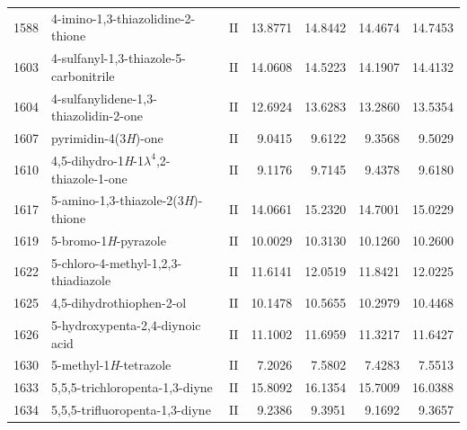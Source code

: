 \begin{longtable}{rlcd{2.5}d{2.5}d{2.5}d{2.5}}
    1588 & 4-imino-1,3-thiazolidine-2-thione                      & II & 13.8771 & 14.8442 & 14.4674 & 14.7453 \\
    1603 & 4-sulfanyl-1,3-thiazole-5-carbonitrile                 & II & 14.0608 & 14.5223 & 14.1907 & 14.4132 \\
    1604 & 4-sulfanylidene-1,3-thiazolidin-2-one                  & II & 12.6924 & 13.6283 & 13.2860 & 13.5354 \\
    1607 & pyrimidin-4(3\textit{H})-one                           & II & 9.0415  & 9.6122  & 9.3568  & 9.5029  \\
    1610 & 4,5-dihydro-1\textit{H}-1$\lambda^4$,2-thiazole-1-one  & II & 9.1176  & 9.7145  & 9.4378  & 9.6180  \\
    1617 & 5-amino-1,3-thiazole-2(3\textit{H})-thione             & II & 14.0661 & 15.2320 & 14.7001 & 15.0229 \\
    1619 & 5-bromo-1\textit{H}-pyrazole                           & II & 10.0029 & 10.3130 & 10.1260 & 10.2600 \\
    1622 & 5-chloro-4-methyl-1,2,3-thiadiazole                    & II & 11.6141 & 12.0519 & 11.8421 & 12.0225 \\
    1625 & 4,5-dihydrothiophen-2-ol                               & II & 10.1478 & 10.5655 & 10.2979 & 10.4468 \\
    1626 & 5-hydroxypenta-2,4-diynoic   acid                      & II & 11.1002 & 11.6959 & 11.3217 & 11.6427 \\
    1630 & 5-methyl-1\textit{H}-tetrazole                         & II & 7.2026  & 7.5802  & 7.4283  & 7.5513  \\
    1633 & 5,5,5-trichloropenta-1,3-diyne                         & II & 15.8092 & 16.1354 & 15.7009 & 16.0388 \\
    1634 & 5,5,5-trifluoropenta-1,3-diyne                         & II & 9.2386  & 9.3951  & 9.1692  & 9.3657 
\end{longtable}


